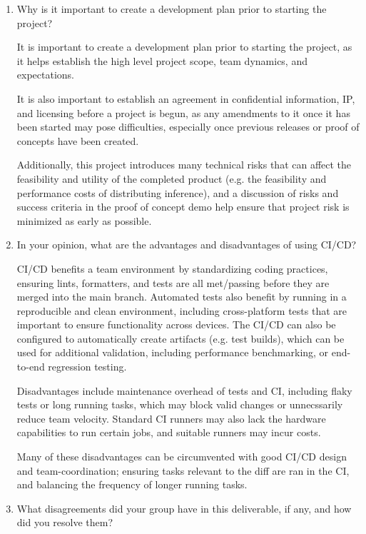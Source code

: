 \documentclass{article}
\begin{document}
\begin{enumerate}
    \item Why is it important to create a development plan prior to starting the
    project?
    
    It is important to create a development plan prior to starting the project, as it helps establish the high level project scope, team dynamics, and expectations.

    It is also important to establish an agreement in confidential information, IP, and licensing before a project is begun, as any amendments to it once it has been started may pose difficulties, especially once previous releases or proof of concepts have been created.

    Additionally, this project introduces many technical risks that can affect the feasibility and utility of the completed product (e.g. the feasibility and performance costs of distributing inference), and a discussion of risks and success criteria in the proof of concept demo help ensure that project risk is minimized as early as possible. 

    \item In your opinion, what are the advantages and disadvantages of using
    CI/CD?

    CI/CD benefits a team environment by standardizing coding practices, ensuring lints, formatters, and tests are all met/passing before they are merged into the main branch. Automated tests also benefit by running in a reproducible and clean environment, including cross-platform tests that are important to ensure functionality across devices. The CI/CD can also be configured to automatically create artifacts (e.g. test builds), which can be used for additional validation, including performance benchmarking, or end-to-end regression testing.

    Disadvantages include maintenance overhead of tests and CI, including flaky tests or long running tasks, which may block valid changes or unnecssarily reduce team velocity. Standard CI runners may also lack the hardware capabilities to run certain jobs, and suitable runners may incur costs.

    Many of these disadvantages can be circumvented with good CI/CD design and team-coordination; ensuring tasks relevant to the diff are ran in the CI, and balancing the frequency of longer running tasks.

    \item What disagreements did your group have in this deliverable, if any,
    and how did you resolve them?


\end{enumerate}
\end{document}
